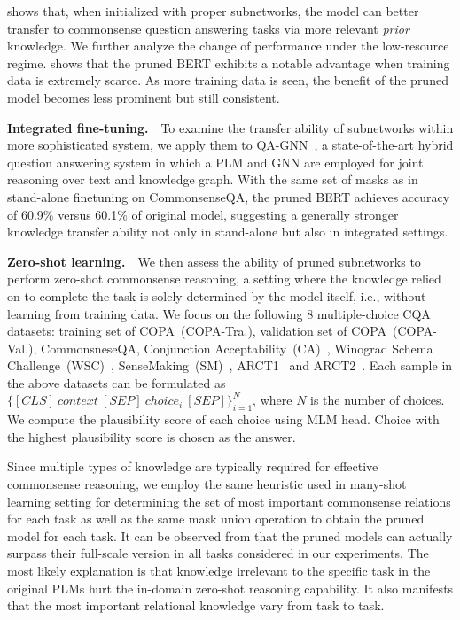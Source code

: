 shows that, when initialized with proper subnetworks, the model can better transfer to commonsense question answering tasks via more relevant \textit{prior} knowledge. We further analyze the change of performance under the low-resource regime.  shows that the pruned \textsc{BERT} exhibits a notable advantage when training data is extremely scarce. As more training data is seen, the benefit of the pruned 
model becomes less prominent but still consistent. 

\textbf{Integrated fine-tuning.}~~To examine the transfer ability of subnetworks within more sophisticated system, we  apply them to QA-GNN~\citep{qagnn}, a state-of-the-art hybrid question answering system in which a PLM and GNN are employed for joint reasoning over text and knowledge graph. With the same set of masks as in stand-alone finetuning on CommonsenseQA, the pruned \textsc{BERT} achieves accuracy of 60.9\% versus 60.1\% of original model, suggesting a generally stronger knowledge transfer ability not only in stand-alone but also in integrated settings.



\textbf{Zero-shot learning.}~~We then assess the ability of pruned 
subnetworks to perform zero-shot commonsense reasoning, a setting where 
the knowledge relied on to complete the task is solely determined by the model 
itself, i.e., without learning from training data. We focus on the following 8 multiple-choice CQA datasets: training set of COPA~(COPA-Tra.), validation set of COPA~(COPA-Val.), CommonsneseQA, Conjunction 
Acceptability~(CA)~\citep{eciplm}, 
Winograd Schema Challenge~(WSC)~\citep{levesque_winograd_2012}, 
SenseMaking~(SM)~\citep{wang-etal-2019-make}, 
ARCT1~\citep{habernal-etal-2018-argument} and 
ARCT2~\citep{DBLP:journals/corr/abs-1907-07355}. Each sample in the above datasets can be formulated as $\{[CLS]~context~[SEP]~choice_i ~[SEP]\}_{i=1}^{N}$, where $N$ is the number of choices. We compute the plausibility score of each choice using MLM head. Choice with the highest plausibility score is chosen as the answer. 




Since multiple types of knowledge are typically required for effective commonsense reasoning, we employ the same heuristic used in many-shot learning setting for determining the set of most important commonsense relations for each task as well as the same mask union operation to obtain the pruned model for each task. 
It can be observed from  that the pruned models can actually surpass their full-scale 
version in all tasks considered in our experiments. 
The most likely explanation is that knowledge irrelevant to the specific task 
in the original PLMs hurt the in-domain zero-shot reasoning capability. 
It also manifests that the most important relational knowledge vary from 
task to task.
